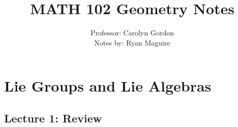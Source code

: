 \documentclass[oneside]{book}                                                  %
\begin{document}
    \title{MATH 102 Geometry Notes}
    \author{%
        Professor: Carolyn Gordon\\
        Notes by: Ryan Maguire%
    }
    \date{\vspace{-5ex}}
    \maketitle
    \tableofcontents
    \listoffigures
    \chapter{Lie Groups and Lie Algebras}
        \section{Lecture 1: Review}
\end{document}

